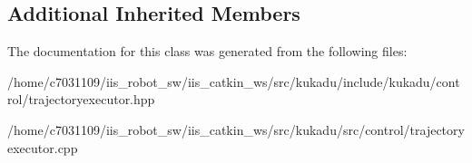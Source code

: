 \subsection*{Additional Inherited Members}


The documentation for this class was generated from the following files\-:\begin{DoxyCompactItemize}
\item 
/home/c7031109/iis\-\_\-robot\-\_\-sw/iis\-\_\-catkin\-\_\-ws/src/kukadu/include/kukadu/control/trajectoryexecutor.\-hpp\item 
/home/c7031109/iis\-\_\-robot\-\_\-sw/iis\-\_\-catkin\-\_\-ws/src/kukadu/src/control/trajectoryexecutor.\-cpp\end{DoxyCompactItemize}
